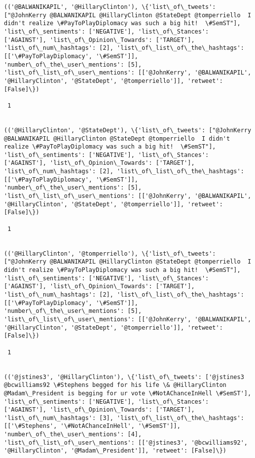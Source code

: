 \documentclass[11pt]{article}
\begin{document}
\begin{Verbatim}[commandchars=\\\{\}]
(('@BALWANIKAPIL', '@HillaryClinton'), \{'list\_of\_tweets': ["@JohnKerry @BALWANIKAPIL @HillaryClinton @StateDept @tomperriello  I didn't realize \#PayToPlayDiplomacy was such a big hit!  \#SemST"], 'list\_of\_sentiments': ['NEGATIVE'], 'list\_of\_Stances': ['AGAINST'], 'list\_of\_Opinion\_Towards': ['TARGET'], 'list\_of\_num\_hashtags': [2], 'list\_of\_list\_of\_the\_hashtags': [['\#PayToPlayDiplomacy', '\#SemST']], 'number\_of\_the\_user\_mentions': [5], 'list\_of\_list\_of\_user\_mentions': [['@JohnKerry', '@BALWANIKAPIL', '@HillaryClinton', '@StateDept', '@tomperriello']], 'retweet': [False]\})

 1
 

(('@HillaryClinton', '@StateDept'), \{'list\_of\_tweets': ["@JohnKerry @BALWANIKAPIL @HillaryClinton @StateDept @tomperriello  I didn't realize \#PayToPlayDiplomacy was such a big hit!  \#SemST"], 'list\_of\_sentiments': ['NEGATIVE'], 'list\_of\_Stances': ['AGAINST'], 'list\_of\_Opinion\_Towards': ['TARGET'], 'list\_of\_num\_hashtags': [2], 'list\_of\_list\_of\_the\_hashtags': [['\#PayToPlayDiplomacy', '\#SemST']], 'number\_of\_the\_user\_mentions': [5], 'list\_of\_list\_of\_user\_mentions': [['@JohnKerry', '@BALWANIKAPIL', '@HillaryClinton', '@StateDept', '@tomperriello']], 'retweet': [False]\})

 1
 

(('@HillaryClinton', '@tomperriello'), \{'list\_of\_tweets': ["@JohnKerry @BALWANIKAPIL @HillaryClinton @StateDept @tomperriello  I didn't realize \#PayToPlayDiplomacy was such a big hit!  \#SemST"], 'list\_of\_sentiments': ['NEGATIVE'], 'list\_of\_Stances': ['AGAINST'], 'list\_of\_Opinion\_Towards': ['TARGET'], 'list\_of\_num\_hashtags': [2], 'list\_of\_list\_of\_the\_hashtags': [['\#PayToPlayDiplomacy', '\#SemST']], 'number\_of\_the\_user\_mentions': [5], 'list\_of\_list\_of\_user\_mentions': [['@JohnKerry', '@BALWANIKAPIL', '@HillaryClinton', '@StateDept', '@tomperriello']], 'retweet': [False]\})

 1
 

(('@jstines3', '@HillaryClinton'), \{'list\_of\_tweets': ['@jstines3 @bcwilliams92 \#Stephens begged for his life \& @HillaryClinton @Madam\_President is begging for ur vote \#NotAChanceInHell \#SemST'], 'list\_of\_sentiments': ['NEGATIVE'], 'list\_of\_Stances': ['AGAINST'], 'list\_of\_Opinion\_Towards': ['TARGET'], 'list\_of\_num\_hashtags': [3], 'list\_of\_list\_of\_the\_hashtags': [['\#Stephens', '\#NotAChanceInHell', '\#SemST']], 'number\_of\_the\_user\_mentions': [4], 'list\_of\_list\_of\_user\_mentions': [['@jstines3', '@bcwilliams92', '@HillaryClinton', '@Madam\_President']], 'retweet': [False]\})


\end{Verbatim}
\end{document}
